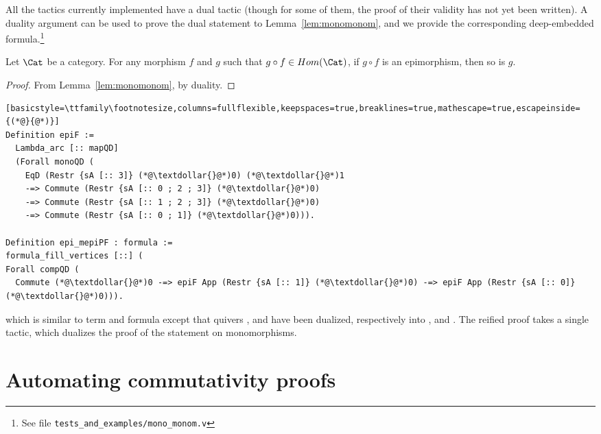 All the tactics currently implemented have a dual tactic (though for some of them, the proof of their validity has not yet been written). A duality argument can be used to prove the dual statement to Lemma~\ref{lem:monomonom}, and we provide the corresponding deep-embedded formula.\footnote{See file \texttt{tests\_and\_examples/mono\_monom.v}}

\begin{lemma}\label{lem:epimepi}
  Let $\Cat$ be a category. For any morphism $f$ and $g$ such that $g \circ f \in Hom(\Cat)$, if $g \circ f$ is an epimorphism, then so is $g$.
\end{lemma}

\begin{proof}
From Lemma~\ref{lem:monomonom}, by duality.
\end{proof}

\begin{lstlisting}[basicstyle=\ttfamily\footnotesize,columns=fullflexible,keepspaces=true,breaklines=true,mathescape=true,escapeinside={(*@}{@*)}]
Definition epiF :=
  Lambda_arc [:: mapQD]
  (Forall monoQD (
    EqD (Restr {sA [:: 3]} (*@\textdollar{}@*)0) (*@\textdollar{}@*)1
    -=> Commute (Restr {sA [:: 0 ; 2 ; 3]} (*@\textdollar{}@*)0)
    -=> Commute (Restr {sA [:: 1 ; 2 ; 3]} (*@\textdollar{}@*)0)
    -=> Commute (Restr {sA [:: 0 ; 1]} (*@\textdollar{}@*)0))).

Definition epi_mepiPF : formula :=
formula_fill_vertices [::] (
Forall compQD (
  Commute (*@\textdollar{}@*)0 -=> epiF App (Restr {sA [:: 1]} (*@\textdollar{}@*)0) -=> epiF App (Restr {sA [:: 0]} (*@\textdollar{}@*)0))).
\end{lstlisting}
which is similar to term  and formula  except that quivers ,  and   have been dualized, respectively into ,  and . The reified proof takes a single tactic, which dualizes the proof of the statement on monomorphisms.





\section{Automating commutativity proofs}\label{sec:autocom}


